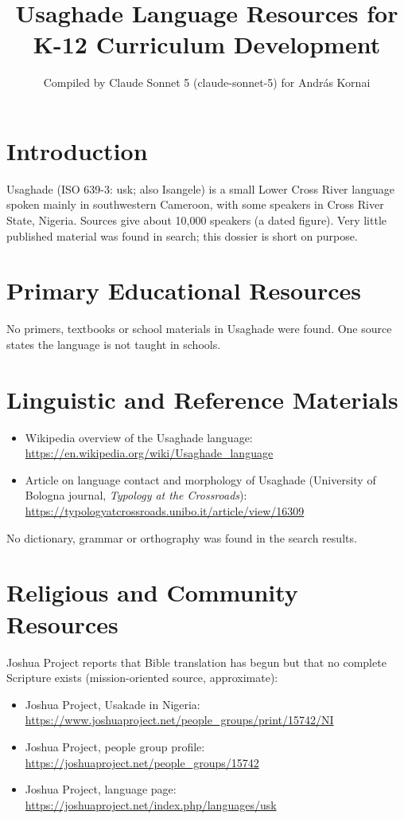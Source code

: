 \documentclass[12pt]{article}
\title{Usaghade Language Resources for K-12 Curriculum Development}
\author{Compiled by Claude Sonnet 5 (claude-sonnet-5) for Andr\'as Kornai}
\date{}
\begin{document}
\maketitle

\section{Introduction}
Usaghade (ISO 639-3: usk; also Isangele) is a small Lower Cross River language spoken mainly in southwestern Cameroon, with some speakers in Cross River State, Nigeria. Sources give about 10,000 speakers (a dated figure). Very little published material was found in search; this dossier is short on purpose.

\section{Primary Educational Resources}
No primers, textbooks or school materials in Usaghade were found. One source states the language is not taught in schools.

\section{Linguistic and Reference Materials}
\begin{itemize}
\item Wikipedia overview of the Usaghade language: \url{https://en.wikipedia.org/wiki/Usaghade_language}
\item Article on language contact and morphology of Usaghade (University of Bologna journal, \emph{Typology at the Crossroads}): \url{https://typologyatcrossroads.unibo.it/article/view/16309}
\end{itemize}
No dictionary, grammar or orthography was found in the search results.

\section{Religious and Community Resources}
Joshua Project reports that Bible translation has begun but that no complete Scripture exists (mission-oriented source, approximate):
\begin{itemize}
\item Joshua Project, Usakade in Nigeria: \url{https://www.joshuaproject.net/people_groups/print/15742/NI}
\item Joshua Project, people group profile: \url{https://joshuaproject.net/people_groups/15742}
\item Joshua Project, language page: \url{https://joshuaproject.net/index.php/languages/usk}
\end{itemize}
\end{document}
